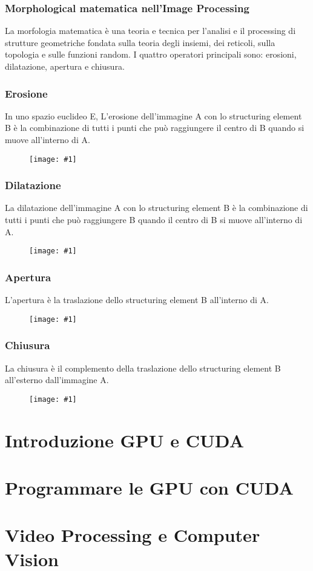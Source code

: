 \documentclass[8pt,a4paper]{article}
\newcommand{\f}[1]{
      \begin{figure}[H]
        \center
      \texttt{[image: \#1]}
      \end{figure}
}
\begin{document}
\begin{multicols}{5}
    \subsubsection{Morphological matematica nell'Image Processing}
    La morfologia matematica è una teoria e tecnica per l’analisi e il processing 
    di strutture geometriche fondata sulla teoria degli insiemi, dei reticoli, 
    sulla topologia e sulle funzioni random.
    I quattro operatori principali sono: erosioni, dilatazione, apertura e chiusura.
    \subsubsection{Erosione}
    In uno spazio euclideo E, L’erosione dell’immagine A con lo structuring element 
    B è la combinazione di tutti i punti che può raggiungere il centro di B quando 
    si muove all’interno di A.
    \f{erosion}
    \subsubsection{Dilatazione}
    La dilatazione dell’immagine A con lo structuring element B è la combinazione 
    di tutti i punti che può raggiungere B quando il centro di B si muove all’interno 
    di A.
    \f{dilatation}
    \subsubsection{Apertura}
    L'apertura è la traslazione dello structuring element B all'interno di A.
    \f{open}
    \subsubsection{Chiusura}
    La chiusura è il complemento della traslazione dello structuring element B 
    all’esterno dall’immagine A.
    \f{closure}


    \section{Introduzione GPU e CUDA}

    \section{Programmare le GPU con CUDA}

    \section{Video Processing e Computer Vision}

\end{multicols}
\end{document}
